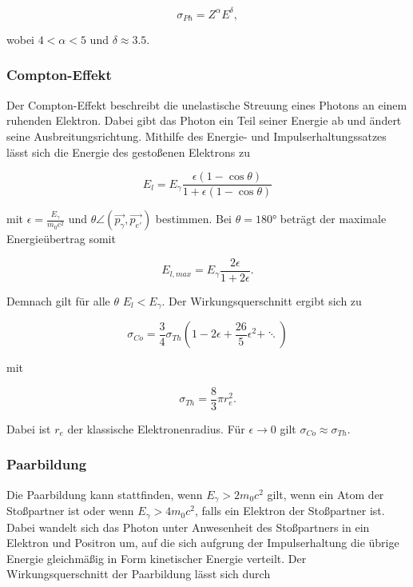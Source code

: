 \begin{equation*}
    \sigma_{Ph} = Z^\alpha E^\delta,
\end{equation*}

wobei $\num{4}<\alpha<\num{5}$ und $\delta \approx \num{3.5} $.

\subsubsection{Compton-Effekt}

Der Compton-Effekt beschreibt die unelastische Streuung eines Photons an einem ruhenden Elektron. Dabei gibt das Photon ein Teil seiner Energie ab 
und ändert seine Ausbreitungsrichtung. Mithilfe des Energie- und Impulserhaltungssatzes lässt sich die Energie des gestoßenen Elektrons zu 

\begin{equation}
    E_l = E_\gamma \frac{\epsilon\left(1-\cos{\theta}\right)}{1+\epsilon\left(1-\cos{\theta}\right)}
    \label{eqn:Compton}
\end{equation}

mit $\epsilon = \frac{E_\gamma}{m_0 c^2}$ und $\theta \angle (\vec{p_\gamma}, \vec{p_{e'}})$ bestimmen. Bei $\theta = 180°$ beträgt der 
maximale Energieübertrag somit

\begin{equation}
    E_{l,max} = E_\gamma \frac{2\epsilon}{1+2\epsilon}.
    \label{eqn:Kante}
\end{equation}

Demnach gilt für alle $\theta$ $E_l < E_\gamma$. Der Wirkungsquerschnitt ergibt sich zu 

\begin{equation*}
    \sigma_{Co} = \frac{3}{4}\sigma_{Th}\left(1-2\epsilon+\frac{26}{5}\epsilon^2+\ddots\right)
\end{equation*}

mit 

\begin{equation*}
    \sigma_{Th} = \frac{8}{3}\pi r_e^2.
\end{equation*}

Dabei ist $r_e$ der klassische Elektronenradius. Für $\epsilon\rightarrow 0$ gilt $\sigma_{Co} \approx \sigma_{Th}$.

\subsubsection{Paarbildung}

Die Paarbildung kann stattfinden, wenn $E_\gamma>2m_0c^2$ gilt, wenn ein Atom der Stoßpartner ist oder wenn $E_\gamma > 4m_0c^2$, falls 
ein Elektron der Stoßpartner ist. Dabei wandelt sich das Photon unter Anwesenheit des Stoßpartners in ein Elektron und Positron um, 
auf die sich aufgrung der Impulserhaltung die übrige Energie gleichmäßig in Form kinetischer Energie verteilt. Der Wirkungsquerschnitt
der Paarbildung lässt sich durch 

